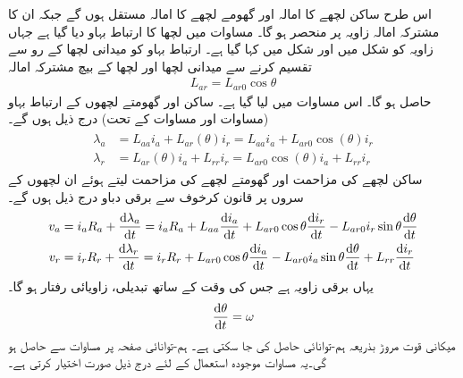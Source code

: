 اس طرح ساکن لچھے کا امالہ  اور گھومے لچھے کا امالہ  مستقل ہوں گے جبکہ ان کا مشترکہ امالہ  زاویہ  پر منحصر ہو گا۔ مساوات  میں لچھا  کا  ارتباط بہاو  دیا گیا ہے  جہاں  زاویہ  کو شکل  میں  اور شکل   میں  کہا گیا ہے۔ ارتباط بہاو   کو میدانی لچھا کے رو  سے تقسیم کرنے سے میدانی لچھا اور لچھا  کے بیچ مشترکہ امالہ 
\begin{align}
L_{ar}=L_{ar0} \cos \theta
\end{align}
حاصل ہو گا۔ اس مساوات میں  لیا گیا ہے۔
ساکن اور گھومتے لچھوں کے ارتباط بہاو  (مساوات  اور مساوات
  کے تحت) درج ذیل ہوں گے۔
\begin{gather}
\begin{aligned}
\lambda_a&=L_{aa} i_a+L_{ar}(\theta) i_r=L_{aa} i_a+L_{ar0} \cos (\theta) i_r\\
\lambda_r&=L_{ar}(\theta) i_a+L_{rr} i_r=L_{ar0} \cos (\theta) i_a+L_{rr} i_r
\end{aligned}
\end{gather}
ساکن لچھے کی مزاحمت  اور گھومتے لچھے کی مزاحمت  لیتے ہوئے ان لچھوں کے سروں پر  قانون کرخوف سے برقی دباو درج ذیل ہوں گے۔
\begin{gather}
\begin{aligned}
v_a&=i_a R_a +\frac{\dif \lambda_a}{\dif t}=i_a R_a+L_{aa} \frac{\dif i_a}{\dif t}+L_{ar0} \cos \theta \frac{\dif i_r}{\dif t}-L_{ar0}  i_r \sin \theta  \frac{\dif \theta}{\dif t}\\
v_r&=i_r R_r +\frac{\dif \lambda_r}{\dif t}=i_r R_r+L_{ar0} \cos \theta \frac{\dif i_a}{\dif t}-L_{ar0} i_a \sin \theta  \frac{\dif \theta}{\dif t}+L_{rr} \frac{\dif i_r}{\dif t}
\end{aligned}
\end{gather}
یہاں  برقی زاویہ ہے جس کی وقت کے ساتھ  تبدیلی، زاویائی رفتار   ہو گا۔
\begin{align}
\frac{\dif \theta}{\dif t}=\omega
\end{align}
میکانی قوت مروڑ بذریعہ ہم-توانائی حاصل کی جا سکتی ہے۔ ہم-توانائی صفحہ  پر مساوات   سے حاصل ہو گی۔یہ مساوات موجودہ استعمال کے لئے درج ذیل صورت اختیار کرتی ہے۔
